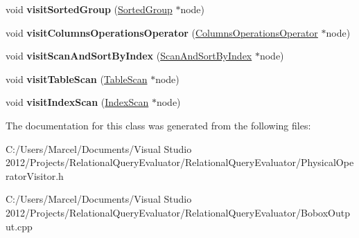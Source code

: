 \begin{DoxyCompactItemize}
\item 
\hypertarget{class_bobox_plan_writing_physical_operator_visitor_a78d8526758ffeb3b335b8fc4a8a2defb}{void {\bfseries visit\+Sorted\+Group} (\hyperlink{class_sorted_group}{Sorted\+Group} $\ast$node)}\label{class_bobox_plan_writing_physical_operator_visitor_a78d8526758ffeb3b335b8fc4a8a2defb}

\item 
\hypertarget{class_bobox_plan_writing_physical_operator_visitor_afe09e3f584a43ff5e06947918cf16a46}{void {\bfseries visit\+Columns\+Operations\+Operator} (\hyperlink{class_columns_operations_operator}{Columns\+Operations\+Operator} $\ast$node)}\label{class_bobox_plan_writing_physical_operator_visitor_afe09e3f584a43ff5e06947918cf16a46}

\item 
\hypertarget{class_bobox_plan_writing_physical_operator_visitor_a09cbea340b85723f8e66e50b466d6e68}{void {\bfseries visit\+Scan\+And\+Sort\+By\+Index} (\hyperlink{class_scan_and_sort_by_index}{Scan\+And\+Sort\+By\+Index} $\ast$node)}\label{class_bobox_plan_writing_physical_operator_visitor_a09cbea340b85723f8e66e50b466d6e68}

\item 
\hypertarget{class_bobox_plan_writing_physical_operator_visitor_aa8d995c39b2364625c1c10b6d7636b23}{void {\bfseries visit\+Table\+Scan} (\hyperlink{class_table_scan}{Table\+Scan} $\ast$node)}\label{class_bobox_plan_writing_physical_operator_visitor_aa8d995c39b2364625c1c10b6d7636b23}

\item 
\hypertarget{class_bobox_plan_writing_physical_operator_visitor_ae042371767ff5d9296468da8037efa0f}{void {\bfseries visit\+Index\+Scan} (\hyperlink{class_index_scan}{Index\+Scan} $\ast$node)}\label{class_bobox_plan_writing_physical_operator_visitor_ae042371767ff5d9296468da8037efa0f}

\end{DoxyCompactItemize}


The documentation for this class was generated from the following files\+:\begin{DoxyCompactItemize}
\item 
C\+:/\+Users/\+Marcel/\+Documents/\+Visual Studio 2012/\+Projects/\+Relational\+Query\+Evaluator/\+Relational\+Query\+Evaluator/Physical\+Operator\+Visitor.\+h\item 
C\+:/\+Users/\+Marcel/\+Documents/\+Visual Studio 2012/\+Projects/\+Relational\+Query\+Evaluator/\+Relational\+Query\+Evaluator/Bobox\+Output.\+cpp\end{DoxyCompactItemize}
